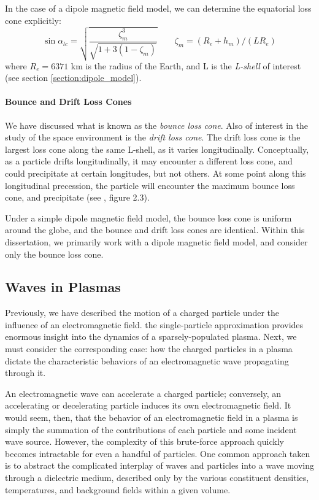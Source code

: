 In the case of a dipole magnetic field model, we can determine the equatorial loss cone explicitly:
\begin{equation}
\sin \alpha_{lc} = \sqrt{\frac{\zeta_m^3}{\sqrt{1 + 3 (1 - \zeta_m)}}} \qquad \zeta_m = (R_e + h_m) / (L R_e)
\end{equation}
where $R_e = 6371$ km is the radius of the Earth, and L is the \emph{L-shell} of interest (see section \ref{section:dipole_model}).



\paragraph{Bounce and Drift Loss Cones}
We have discussed what is known as the \emph{bounce loss cone}. Also of interest in the study of the space environment is the \emph{drift loss cone}. The drift loss cone is the largest loss cone along the same L-shell, as it varies longitudinally. Conceptually, as a particle drifts longitudinally, it may encounter a different loss cone, and could precipitate at certain longitudes, but not others. At some point along this longitudinal precession, the particle will encounter the maximum bounce loss cone, and precipitate (see \cite{Cotts2011}, figure 2.3). 

Under a simple dipole magnetic field model, the bounce loss cone is uniform around the globe, and the bounce and drift loss cones are identical. Within this dissertation, we primarily work with a dipole magnetic field model, and consider only the bounce loss cone.

\subsection{Waves in Plasmas}
Previously, we have described the motion of a charged particle under the influence of an electromagnetic field. the single-particle approximation provides enormous insight into the dynamics of a sparsely-populated plasma. Next, we must consider the corresponding case: how the charged particles in a plasma dictate the characteristic behaviors of an electromagnetic wave propagating through it.

An electromagnetic wave can accelerate a charged particle; conversely, an accelerating or decelerating particle induces its own electromagnetic field. It would seem, then, that the behavior of an electromagnetic field in a plasma is simply the summation of the contributions of each particle and some incident wave source. However, the complexity of this brute-force approach quickly becomes intractable for even a handful of particles. One common approach taken is to abstract the complicated interplay of waves and particles into a wave moving through a dielectric medium, described only by the various constituent densities, temperatures, and background fields within a given volume. 

